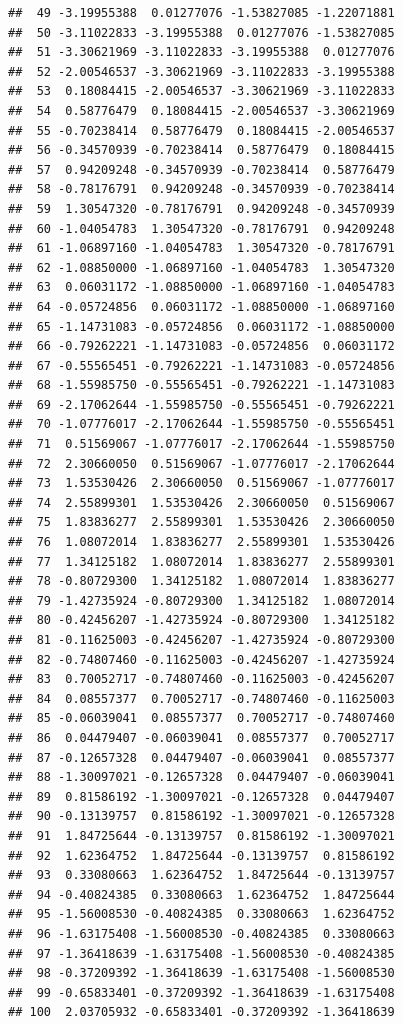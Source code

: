 \documentclass[
]{book}
\theoremstyle{definition}
\theoremstyle{definition}
\theoremstyle{definition}
\theoremstyle{definition}
\theoremstyle{remark}
\begin{document}
\begin{verbatim}
##  49 -3.19955388  0.01277076 -1.53827085 -1.22071881
##  50 -3.11022833 -3.19955388  0.01277076 -1.53827085
##  51 -3.30621969 -3.11022833 -3.19955388  0.01277076
##  52 -2.00546537 -3.30621969 -3.11022833 -3.19955388
##  53  0.18084415 -2.00546537 -3.30621969 -3.11022833
##  54  0.58776479  0.18084415 -2.00546537 -3.30621969
##  55 -0.70238414  0.58776479  0.18084415 -2.00546537
##  56 -0.34570939 -0.70238414  0.58776479  0.18084415
##  57  0.94209248 -0.34570939 -0.70238414  0.58776479
##  58 -0.78176791  0.94209248 -0.34570939 -0.70238414
##  59  1.30547320 -0.78176791  0.94209248 -0.34570939
##  60 -1.04054783  1.30547320 -0.78176791  0.94209248
##  61 -1.06897160 -1.04054783  1.30547320 -0.78176791
##  62 -1.08850000 -1.06897160 -1.04054783  1.30547320
##  63  0.06031172 -1.08850000 -1.06897160 -1.04054783
##  64 -0.05724856  0.06031172 -1.08850000 -1.06897160
##  65 -1.14731083 -0.05724856  0.06031172 -1.08850000
##  66 -0.79262221 -1.14731083 -0.05724856  0.06031172
##  67 -0.55565451 -0.79262221 -1.14731083 -0.05724856
##  68 -1.55985750 -0.55565451 -0.79262221 -1.14731083
##  69 -2.17062644 -1.55985750 -0.55565451 -0.79262221
##  70 -1.07776017 -2.17062644 -1.55985750 -0.55565451
##  71  0.51569067 -1.07776017 -2.17062644 -1.55985750
##  72  2.30660050  0.51569067 -1.07776017 -2.17062644
##  73  1.53530426  2.30660050  0.51569067 -1.07776017
##  74  2.55899301  1.53530426  2.30660050  0.51569067
##  75  1.83836277  2.55899301  1.53530426  2.30660050
##  76  1.08072014  1.83836277  2.55899301  1.53530426
##  77  1.34125182  1.08072014  1.83836277  2.55899301
##  78 -0.80729300  1.34125182  1.08072014  1.83836277
##  79 -1.42735924 -0.80729300  1.34125182  1.08072014
##  80 -0.42456207 -1.42735924 -0.80729300  1.34125182
##  81 -0.11625003 -0.42456207 -1.42735924 -0.80729300
##  82 -0.74807460 -0.11625003 -0.42456207 -1.42735924
##  83  0.70052717 -0.74807460 -0.11625003 -0.42456207
##  84  0.08557377  0.70052717 -0.74807460 -0.11625003
##  85 -0.06039041  0.08557377  0.70052717 -0.74807460
##  86  0.04479407 -0.06039041  0.08557377  0.70052717
##  87 -0.12657328  0.04479407 -0.06039041  0.08557377
##  88 -1.30097021 -0.12657328  0.04479407 -0.06039041
##  89  0.81586192 -1.30097021 -0.12657328  0.04479407
##  90 -0.13139757  0.81586192 -1.30097021 -0.12657328
##  91  1.84725644 -0.13139757  0.81586192 -1.30097021
##  92  1.62364752  1.84725644 -0.13139757  0.81586192
##  93  0.33080663  1.62364752  1.84725644 -0.13139757
##  94 -0.40824385  0.33080663  1.62364752  1.84725644
##  95 -1.56008530 -0.40824385  0.33080663  1.62364752
##  96 -1.63175408 -1.56008530 -0.40824385  0.33080663
##  97 -1.36418639 -1.63175408 -1.56008530 -0.40824385
##  98 -0.37209392 -1.36418639 -1.63175408 -1.56008530
##  99 -0.65833401 -0.37209392 -1.36418639 -1.63175408
## 100  2.03705932 -0.65833401 -0.37209392 -1.36418639
\end{verbatim}
\end{document}
